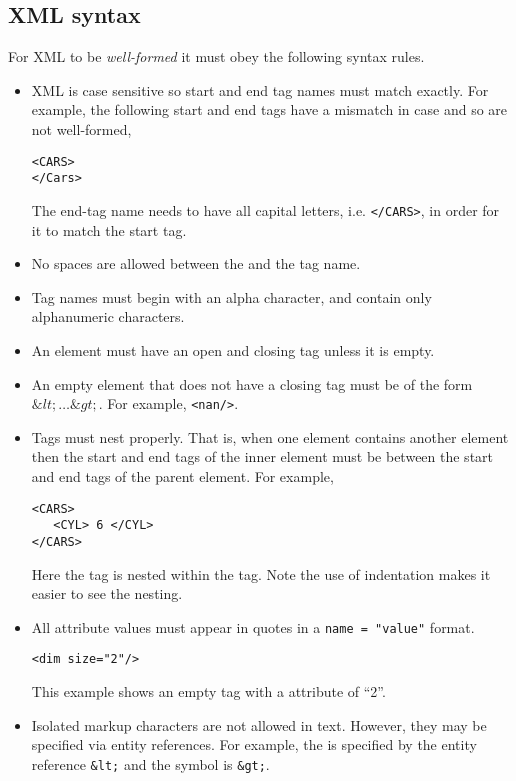\subsection{XML syntax}

For XML to be \textit{well-formed} it must obey the
following syntax rules.

\begin{itemize}
\item XML is case sensitive so start and end
tag names must match exactly. For example, the following
start and end tags have a mismatch in case and so are not well-formed,
\begin{verbatim}
<CARS>
</Cars>
\end{verbatim}
The end-tag name needs to have all capital letters, i.e. \verb+</CARS>+, 
in order for it to match the start tag.
\item No spaces are allowed between the \lt and the tag name.
\item Tag names must begin with an alpha character, and contain
only alphanumeric characters.
\item  An element must have an open and closing tag unless it is empty.
\item  An empty element that does not have a closing tag must be of the 
form $\&lt; \ldots \&gt;$. For example, \verb+<nan/>+.
\item Tags must nest properly. That is, when one element contains 
another element then the start and end tags of the inner element must 
be between the start and end tags of the parent element.
For example,
\begin{verbatim}
<CARS>
   <CYL> 6 </CYL>
</CARS>
\end{verbatim}
Here the  tag is nested within the  tag.
Note the use of indentation makes it easier to see the nesting.

\item All attribute values must appear in quotes in a \verb+name = "value"+
format.
\begin{verbatim}
<dim size="2"/>
\end{verbatim}
This example shows an empty tag with a  attribute
of ``2''.
\item Isolated markup characters are not allowed in text. 
However, they may be specified via entity references. 
For example, the \lt is specified by the entity reference 
\verb+&lt;+
and the \gt symbol is 
\verb+&gt;+.
\end{itemize}

